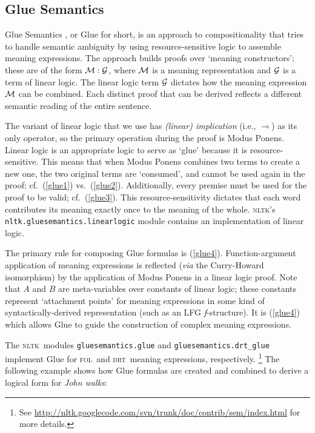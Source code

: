 \documentclass[11pt, a4paper]{article}
\newcommand{\DRT}{\textsc{drt}}
\newcommand{\FOL}{\textsc{fol}}
\newcommand{\NLTK}{\textsc{nltk}}
\begin{document}
\subsection{Glue Semantics}
Glue Semantics
 \citep{Dalrymple:1999:RRB}, or Glue for
short, is an approach to compositionality that tries to handle
semantic ambiguity by using resource-sensitive logic to assemble
meaning expressions.
The approach builds proofs over `meaning constructors'; these are of the
form $\cal{M}: \cal{G}$, where $\cal{M}$ is a meaning representation and
$\cal{G}$ is a term of linear logic.  The linear logic term $\cal{G}$
dictates how the meaning expression $\cal{M}$ can be combined.  Each
distinct proof that can be derived reflects a different semantic
reading of the entire sentence.

The variant of linear logic that we use has \emph{(linear)
  implication} (i.e., $\multimap$)  as its
only operator, so the primary operation during the proof is Modus
Ponens.  Linear logic is an appropriate logic to serve as `glue'
because it is resource-sensitive.  This means that when Modus Ponens
combines two terms to create a new one, the two original
terms are `consumed', and cannot be used again in the proof;
cf.\ (\ref{glue1}) vs.\ (\ref{glue2}).
Additionally, every premise must be used for the proof to be valid;
cf.\ (\ref{glue3}).
This resource-sensitivity dictates that each word contributes its
meaning exactly once to the meaning of the whole.
\newpage
{}
\NLTK's \texttt{nltk.gluesemantics.linearlogic} module
contains an implementation of linear logic. 

The primary rule for composing Glue formulas is (\ref{glue4}).
Function-argument application of meaning expressions is reflected (\textit{via}
the Curry-Howard isomorphism) by the application of Modus Ponens in a
linear logic proof. Note that $A$ and $B$ are meta-variables over
constants of linear logic; these constants represent `attachment
points' for meaning expressions in some kind of syntactically-derived
representation (such as an LFG \textit{f}-structure).  It is
(\ref{glue4}) which allows Glue to guide the construction of complex
meaning expressions.  
\vspace{-3ex}

The \NLTK\ modules \texttt{gluesemantics.glue} and
\texttt{gluesemantics.drt\_glue} implement Glue for \FOL\ and \DRT\
meaning expressions,
respectively.%
\footnote{See
  \url{http://nltk.googlecode.com/svn/trunk/doc/contrib/sem/index.html}
for more details.}
The following example shows how Glue formulas are
created and combined to derive a logical form for \textit{John walks}:
\end{document}

